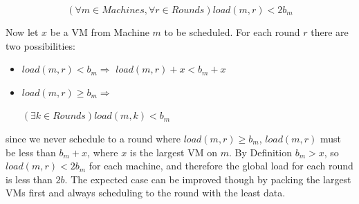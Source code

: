 \[
    (\forall m \in Machines, \forall r \in Rounds) load(m,r) < 2b_m
\]

Now let $x$ be a VM from Machine $m$ to be scheduled.
For each round $r$ there are two possibilities:
\begin{itemize}
    \item $load(m,r) < b_m \Longrightarrow$
        $load(m,r)+x < b_m+x$
    \item $load(m,r) \ge b_m \Longrightarrow$

        $(\exists k \in Rounds) load(m,k) < b_m$
\end{itemize}

since we never schedule to a round where $load(m,r) \ge b_m$, $load(m,r)$ must
be less than $b_m+x$, where $x$ is the largest VM on $m$. By Definition
$b_m > x$, so
$load(m,r) < 2b_m$ for each machine, and therefore the global load for each
round is less than $2b$.
The expected case can be improved though by
packing the largest VMs first and always scheduling to the round with the least
data.
